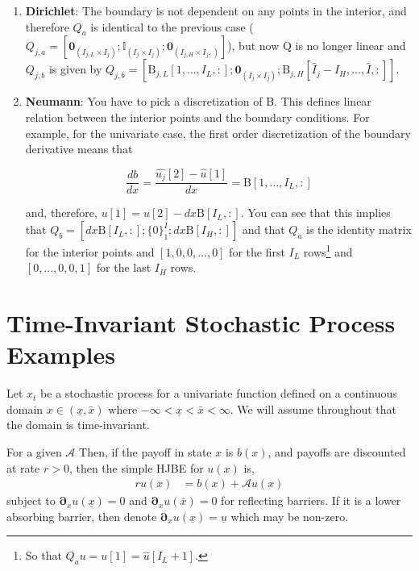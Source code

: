 \documentclass[11pt]{article}
\newcommand{\D}[1][]{\ensuremath{\boldsymbol{\partial}_{#1}}}
\newcommand{\A}{\ensuremath{\mathcal{A}}}
\begin{document}
\begin{itemize}
\begin{enumerate}
	\item \textbf{Dirichlet}: The boundary is not dependent on any points in the interior, and therefore $Q_a$ is identical to the previous case ($Q_{j,a} = [\textbf{0}_{(I_{j,L} \times I_j)}; \mathbb{I}_{(I_j \times I_j)} ; \textbf{0}_{(I_{j,H} \times I_j,)} ]$), but now Q is no longer linear and
	 $Q_{j,b}$ is given by 
	 $Q_{j,b} = [\text{B}_{j,L}[1,\dots,I_L,:]; \textbf{0}_{(I_j\times I_j)};
	\text{B}_{j,H}[\hat{I}_j - I_H,\dots,\hat{I},:]]$.
			
	\item \textbf{Neumann}: You have to pick a discretization of B. 
	This defines linear relation between the interior points and the boundary conditions. For example, for the univariate case, the first order discretization of the boundary derivative means that 
			
	\begin{equation}
		\frac{db}{dx} = \frac{\hat{u_j}[2] - \hat{u}[1]}{dx} = \text{B}[1,\dots,I_{L},:]
	\end{equation}
			
	and, therefore, $u[1] = u[2] - dx\text{B}[I_L,:]$. You can see that this implies that $Q_b = [dx\text{B}[I_L,:];\{0\}_1^I;dx \text{B}[I_H,:]]$ and that $Q_a$ is the identity matrix for the interior points and $[1,0, 0,...,0]$ for the first $I_L$ rows\footnote{So that $Q_a u = u[1] = \hat{u}[I_L+1]$.} and $[0,...,0,0,1]$ for the last $I_H$ rows.%
			
\end{enumerate}
\end{itemize}

\section{Time-Invariant Stochastic Process Examples}
Let $x_t$ be a stochastic process for a univariate function defined on a continuous domain $x \in (\underline{x}, \bar{x})$ where $-\infty < \underline{x} < \bar{x} < \infty$.  We will assume throughout that the domain is time-invariant.

For a given $\A$ Then, if the payoff in state $x$ is $b(x)$, and payoffs are discounted at rate $r > 0$, then the simple HJBE for $u(x)$ is,
\begin{align}
r u(x) &= b(x) + \A u(x)\label{eq:general-stationary-HJBE}
\end{align}
subject to $\D[x]u(\underline{x}) = 0$ and $\D[x]u(\bar{x}) = 0$ for reflecting barriers.  If it is a lower absorbing barrier, then denote $\D[x]u(\underline{x}) = \underline{u}$ which may be non-zero.
\end{document}
